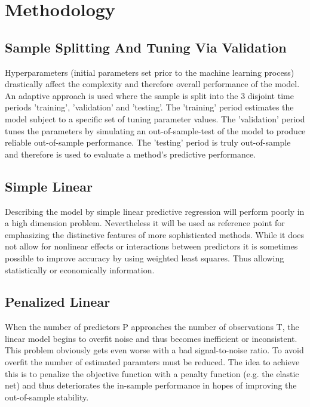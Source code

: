 \documentclass{article}
\begin{document}
\section{Methodology}

\subsection{Sample Splitting And Tuning Via Validation}
	Hyperparameters (initial parameters set prior to the machine learning process)
	drastically affect the complexity and therefore overall performance of the model.
	An adaptive approach is used where the sample is split into the 3 disjoint time periods
	'training', 'validation' and 'testing'. The 'training' period estimates the model
	subject to a specific set of tuning parameter values. The 'validation' period
	tunes the parameters by simulating an out-of-sample-test of the model
	to produce reliable out-of-sample performance. The 'testing' period is truly
	out-of-sample and therefore is used to evaluate a method’s predictive performance.

\subsection{Simple Linear}
	Describing the model by simple linear predictive regression will perform poorly in a high
	dimension problem. Nevertheless it will be used as reference point for emphasizing the distinctive
	features of more sophisticated methods.
	While it does not allow for nonlinear effects or interactions between predictors
	it is sometimes possible to improve accuracy by using weighted least squares.
	Thus allowing statistically or economically information.

\subsection{Penalized Linear}
	When the number of predictors P approaches the number of observations T,
	the linear model begins to overfit noise and thus becomes inefficient or inconsistent.
	This problem obviously gets even worse with a bad signal-to-noise ratio.
	To avoid overfit the number of estimated paramters must be reduced.
	The idea to achieve this is to penalize the objective function with a penalty
	function (e.g. the elastic net) and thus deteriorates the in-sample performance
	in hopes of improving the out-of-sample stability.
\end{document}
